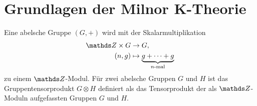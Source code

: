 \documentclass[ngerman,fontsize=11pt, paper=a4, parskip=half, titlepage=true, toc=bib]{scrartcl}
\begin{document}
\maketitle
\tableofcontents


\section{Grundlagen der Milnor K-Theorie}

\begin{Bem}[Gruppentensorprodukt]
  Eine abelsche Gruppe $(G,+)$ wird mit der Skalarmultiplikation
  \begin{align*}
    \Z \times G &\to G,\\
    (n,g)&\mapsto \underbrace{g+\dotsb+g}_{\scriptsize\text{$n$-mal}}
  \end{align*}
  zu einem $\Z$-Modul.
  Für zwei abelsche Gruppen $G$ und $H$ ist das 
  Gruppentensorprodukt $G\otimes H$
  definiert als das Tensorprodukt der als $\Z$-Moduln
  aufgefassten Gruppen $G$ und $H$.
  



\end{Bem}
\end{document}
